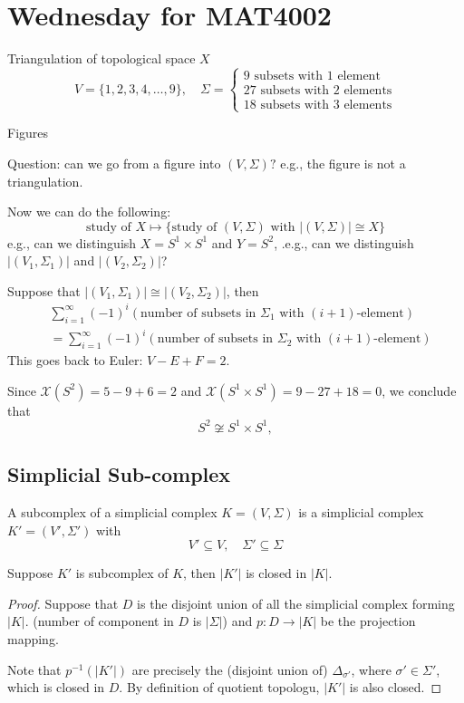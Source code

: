 \section{Wednesday for MAT4002}
Triangulation of topological space $X$
\[
V=\{1,2,3,4,\dots,9\},\quad
\Sigma=\left\{
\begin{aligned}
\text{$9$ subsets with $1$ element}\\
\text{$27$ subsets with $2$ elements}\\
\text{$18$ subsets with $3$ elements}
\end{aligned}
\right.
\]

Figures

Question: can we go from a figure into $(V,\Sigma)?$
e.g.,
the figure is not a triangulation.

Now we can do the following:
\[
\text{study of $X$}\mapsto\{\text{study of $(V,\Sigma)$ with $|(V,\Sigma)|\cong X$}\}
\]
e.g., can we distinguish $X=S^1\times S^1$ and $Y=S^2$, .e.g., can we distinguish $|(V_1,\Sigma_1)|$ and $|(V_2,\Sigma_2)|$?

\begin{theorem}
Suppose that $|(V_1,\Sigma_1)|\cong|(V_2,\Sigma_2)|$, then 
\begin{align*}
&\sum_{i=1}^\infty(-1)^i\left(\text{number of subsets in $\Sigma_1$ with $(i+1)$-element}\right)\\
&=
\sum_{i=1}^\infty(-1)^i\left(\text{number of subsets in $\Sigma_2$ with $(i+1)$-element}\right)
\end{align*}
This goes back to Euler: $V-E+F = 2$.
\end{theorem}
Since $\mathcal{X}(S^2) = 5-9+6=2$ and $\mathcal{X}(S^1\times S^1) = 9-27+18=0$, we conclude that
\[
S^2\not\cong S^1\times S^1,
\]

\subsection{Simplicial Sub-complex}

\begin{definition}
A subcomplex of a simplicial complex $K=(V,\Sigma)$ is a simplicial complex $K'=(V',\Sigma')$ with 
\[
V'\subseteq V,\quad
\Sigma'\subseteq\Sigma
\]
\end{definition}
\begin{proposition}
Suppose $K'$ is subcomplex of $K$, then $|K'|$ is closed in $|K|$.
\end{proposition}
\begin{proof}
Suppose that $D$ is the disjoint union of all the simplicial complex forming $|K|$. (number of component in $D$ is $|\Sigma|$)
and
$p:D\to|K|$ be the projection mapping.

Note that $p^{-1}(|K'|)$ are precisely the (disjoint union of) $\Delta_{\sigma'}$, where $\sigma'\in\Sigma'$, which is closed in $D$.
By definition of quotient topologu, $|K'|$ is also closed. 
\end{proof}

